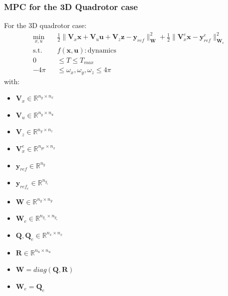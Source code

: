 \documentclass{thesisbeamer}
\begin{document}
\begin{frame}
	\frametitle{MPC for the 3D Quadrotor case}
	
	For the 3D quadrotor case:
	\begin{equation}\label{mpc_optimization_problem_3d_quadrotor}
\begin{aligned}
            \min_{x,u} \quad & \frac{1}{2}\|\bm{V}_x \bm{x} + \bm{V}_u \bm{u} + \bm{V}_z \bm{z} - \bm{y}_{ref}\|^2_{\bm{W}} + \frac{1}{2}\|\bm{V}_x^e \bm{x} - \bm{y}_{ref}^e \|^2_{\bm{W}_e} \\
            \textrm{s.t.} \quad & f(\bm{x},\bm{u}):\text{dynamics} \\
             0 &\leq T \leq T_{max} \\
             -4 \pi &\leq \omega_x, \omega_y, \omega_z \leq 4 \pi
        \end{aligned}
\end{equation}
with: 
\begin{multicols}{3}
\begin{itemize}
	\item $\bm{V}_x \in \mathbb{R}^{n_y \times n_x}$
	\item $\bm{V}_u \in \mathbb{R}^{n_y \times n_u}$ 
	\item $\bm{V}_z \in \mathbb{R}^{n_y \times n_z}$
	\item $\bm{V}_x^e \in \mathbb{R}^{n_{ye}\times n_x}$
\end{itemize}
\columnbreak
\begin{itemize}
	\item $\bm{y}_{ref} \in \mathbb{R}^{n_y}$
	\item $\bm{y}_{ref_e} \in \mathbb{R}^{n_{y_e}}$
	\item $\bm{W} \in \mathbb{R}^{n_y \times n_y}$
	\item $\bm{W}_e \in \mathbb{R}^{n_{y_e} \times n_{y_e}}$
\end{itemize}
\columnbreak
\begin{itemize}
	\item $\bm{Q},\bm{Q}_e \in \mathbb{R}^{n_x \times n_x}$
	\item $\bm{R} \in \mathbb{R}^{n_u \times n_u}$
	\item $\bm{W} = diag(\bm{Q},\bm{R}) $
	\item $\bm{W}_e = \bm{Q}_e $
\end{itemize}
\end{multicols}
	
\end{frame}
\end{document}
